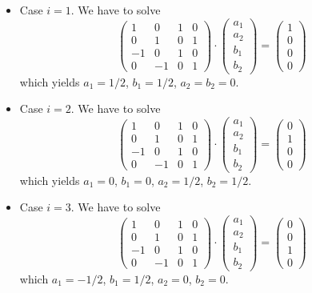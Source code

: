 \begin{itemize}
\item Case $i=1$. We have to solve
\[
\left(\begin{array}{cccc}
1 & 0 & 1 & 0 \\
0 & 1 & 0 & 1 \\
-1 & 0 & 1 & 0\\
0 & -1 & 0 & 1
\end{array}\right)
\cdot
\left(\begin{array}{c}
a_1 \\ a_2 \\ b_1 \\ b_2
\end{array}\right)
=
\left(\begin{array}{c}
1 \\ 0 \\ 0 \\ 0
\end{array}\right)
\]
which yields
$a_1=1/2$, $b_1=1/2$, $a_2=b_2=0$.


\item Case $i=2$. We have to solve
\[
\left(\begin{array}{cccc}
1 & 0 & 1 & 0 \\
0 & 1 & 0 & 1 \\
-1 & 0 & 1 & 0\\
0 & -1 & 0 & 1
\end{array}\right)
\cdot
\left(\begin{array}{c}
a_1 \\ a_2 \\ b_1 \\ b_2
\end{array}\right)
=
\left(\begin{array}{c}
0 \\ 1 \\ 0 \\ 0
\end{array}\right)
\]
which yields $a_1=0$, $b_1=0$, $a_2=1/2$, $b_2=1/2$.


\item Case $i=3$. We have to solve
\[
\left(\begin{array}{cccc}
1 & 0 & 1 & 0 \\
0 & 1 & 0 & 1 \\
-1 & 0 & 1 & 0\\
0 & -1 & 0 & 1
\end{array}\right)
\cdot
\left(\begin{array}{c}
a_1 \\ a_2 \\ b_1 \\ b_2
\end{array}\right)
=
\left(\begin{array}{c}
0 \\ 0 \\ 1 \\ 0
\end{array}\right)
\]
which $a_1=-1/2$, $b_1=1/2$, $a_2=0$, $b_2=0$.


\end{itemize}
